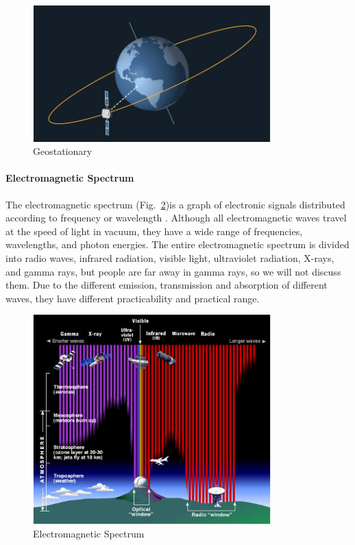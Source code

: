 \documentclass[conference]{IEEEtran}
\begin{document}
\begin{figure}[htbp]
    \centerline{\includegraphics[width=260pt]{images/1.1.3.png}}
    \caption{Geostationary}
    \label{Geostationary}
\end{figure}

\paragraph{Electromagnetic Spectrum} 
The electromagnetic spectrum (Fig.~\ref{Spectrum})is a graph of electronic signals distributed according to frequency or wavelength \cite{electrom75:online}. Although all electromagnetic waves travel at the speed of light in vacuum, they have a wide range of frequencies, wavelengths, and photon energies. The entire electromagnetic spectrum is divided into radio waves, infrared radiation, visible light, ultraviolet radiation, X-rays, and gamma rays, but people are far away in gamma rays, so we will not discuss them. Due to the different emission, transmission and absorption of different waves, they have different practicability and practical range.

\begin{figure}[htbp]
    \centerline{\includegraphics[width=260pt]{images/1.2.png}}
    \caption{Electromagnetic Spectrum}
    \label{Spectrum}
\end{figure}
\end{document}
